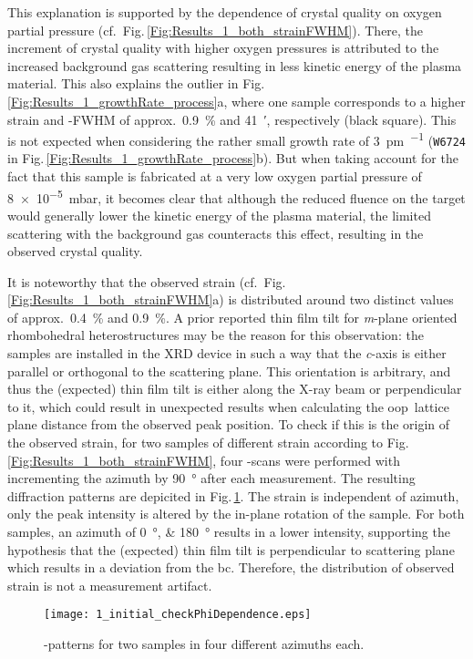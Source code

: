 This explanation is supported by the dependence of crystal quality on oxygen partial pressure (cf.\ Fig.\,\ref{Fig:Results_1_both_strainFWHM}).
There, the increment of crystal quality with higher oxygen pressures is attributed to the increased background gas scattering resulting in less kinetic energy of the plasma material.
This also explains the outlier in Fig.\,\ref{Fig:Results_1_growthRate_process}a, where one sample corresponds to a higher strain and \textomega-FWHM of approx.\ \qty{0.9}{\percent} and \qty{41}{\arcminute}, respectively (black square).
This is not expected when considering the rather small growth rate of \qty{3}{\pm\per\pulse} (\texttt{W6724} in Fig.\,\ref{Fig:Results_1_growthRate_process}b).
But when taking account for the fact that this sample is fabricated at a very low oxygen partial pressure of \qty{8e-5}{\milli\bar}, it becomes clear that although the reduced fluence on the target would generally lower the kinetic energy of the plasma material, the limited scattering with the background gas counteracts this effect, resulting in the observed crystal quality.

It is noteworthy that the observed strain (cf.\ Fig.\,\ref{Fig:Results_1_both_strainFWHM}a) is distributed around two distinct values of approx.\ \qty{0.4}{\percent} and \qty{0.9}{\percent}.
A prior reported thin film tilt for \textit{m}-plane oriented rhombohedral heterostructures
    \cite{kneiss2021}
may be the reason for this observation:
the samples are installed in the XRD device in such a way that the \textit{c}-axis is either parallel or orthogonal to the scattering plane.
This orientation is arbitrary, and thus the (expected) thin film tilt is either along the X-ray beam or perpendicular to it, which could result in unexpected results when calculating the \gls{oop}\ lattice plane distance from the observed peak position.
To check if this is the origin of the observed strain, for two samples of different strain according to Fig.\,\ref{Fig:Results_1_both_strainFWHM}, four \thetaomega-scans were performed with incrementing the azimuth by \qty{90}{\degree} after each measurement.
The resulting diffraction patterns are depicited in Fig.\,\ref{Fig:Results_1_checkPhi}.
The strain is independent of azimuth, only the peak intensity is altered by the in-plane rotation of the sample.
For both samples, an azimuth of \qtylist{0;180}{\degree} results in a lower intensity, supporting the hypothesis that the (expected) thin film tilt is perpendicular to scattering plane which results in a deviation from the \gls{bc}.
Therefore, the distribution of observed strain is not a measurement artifact.
\begin{figure}
    \centering
    \texttt{[image: 1\_initial\_checkPhiDependence.eps]}
    \caption{\thetaomega-patterns for two samples in four different azimuths each.}
    \label{Fig:Results_1_checkPhi}
\end{figure}
